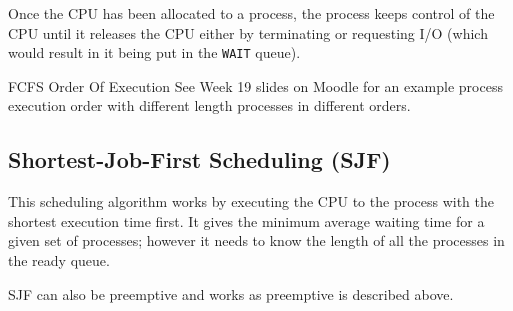 Once the CPU has been allocated to a process, the process keeps control of the CPU until it releases the CPU either by terminating or requesting I/O (which would result in it being put in the \verb|WAIT| queue).

\begin{link}{FCFS Order Of Execution}
See Week 19 slides on Moodle for an example process execution order with different length processes in different orders.
\end{link}

\subsection{Shortest-Job-First Scheduling (SJF)}
This scheduling algorithm works by executing the CPU to the process with the shortest execution time first. It gives the minimum average waiting time for a given set of processes; however it needs to know the length of all the processes in the ready queue. 

SJF can also be preemptive and works as preemptive is described above. 
